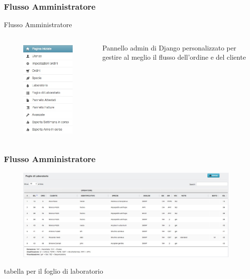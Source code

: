 \documentclass{beamer}
\begin{document}
\begin{frame}
 \frametitle{Flusso Amministratore}
 \begin{center}
  {\huge Flusso Amministratore}
  \begin{columns}
    \begin{figure}
      \includegraphics[scale=0.4]{images/admin-navbar}
    \end{figure} 
   \begin{center}
 	Pannello admin di Django personalizzato per gestire al meglio il flusso dell'ordine e del cliente
   \end{center}
  \end{columns}
 \end{center}
\end{frame}

\begin{frame}
 \frametitle{Flusso Amministratore}
 \begin{center}
  \begin{figure}
    \includegraphics[scale=0.2]{images/admin-fogliolab-tab}
  \end{figure} 
  tabella per il foglio di laboratorio
 \end{center}
\end{frame}
\end{document}
